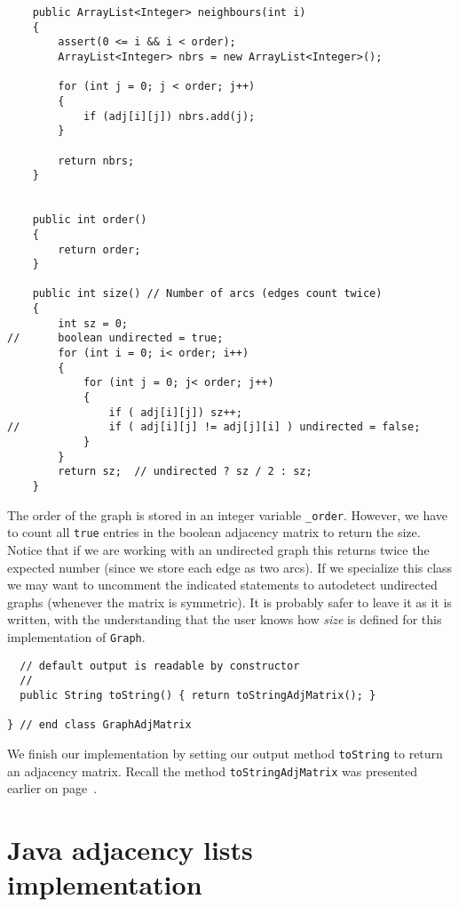 {\renewcommand{\ttdefault}{pcr} %
\footnotesize \begin{verbatim}
    public ArrayList<Integer> neighbours(int i)
    {
        assert(0 <= i && i < order);
        ArrayList<Integer> nbrs = new ArrayList<Integer>();

        for (int j = 0; j < order; j++)
        {
            if (adj[i][j]) nbrs.add(j);
        }

        return nbrs;
    }


    public int order()
    {
        return order;
    }

    public int size() // Number of arcs (edges count twice)
    {
        int sz = 0;
//      boolean undirected = true;
        for (int i = 0; i< order; i++)
        {
            for (int j = 0; j< order; j++)
            {
                if ( adj[i][j]) sz++;
//              if ( adj[i][j] != adj[j][i] ) undirected = false;
            }
        }
        return sz;  // undirected ? sz / 2 : sz;
    }
\end{verbatim}%
}

The order of the graph is stored in an integer variable \verb|_order|.
However, we have to count all \verb|true| entries in the boolean
adjacency matrix to return the size.   Notice that if we  are working
with an undirected graph this returns twice the expected number
(since we store each edge as two arcs).   If we specialize this
class we may want to uncomment the indicated statements to autodetect
undirected graphs (whenever the matrix is symmetric). It is probably
safer to leave it as it is written, with the understanding that the
user knows how \emph{size} is defined for this implementation of
\verb|Graph|.


{\renewcommand{\ttdefault}{pcr} %
\footnotesize \begin{verbatim}
  // default output is readable by constructor
  //
  public String toString() { return toStringAdjMatrix(); }
  
} // end class GraphAdjMatrix
\end{verbatim}%
}

We finish our implementation by setting our output method \verb|toString| 
to return an adjacency matrix.   Recall the method \verb|toStringAdjMatrix|
was presented earlier on page~\pageref{graphoutput}.

\section{Java adjacency lists implementation}

